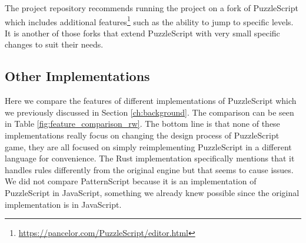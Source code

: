The project repository recommends running the project on a fork of PuzzleScript which includes additional features\footnote{\url{https://pancelor.com/PuzzleScript/editor.html}} such as the ability to jump to specific levels. It is another of those forks that extend PuzzleScript with very small specific changes to suit their needs\cite{pancelor}.

\subsection{Other Implementations}
Here we compare the features of different implementations of PuzzleScript which we previously discussed in Section \ref{ch:background}. The comparison can be seen in Table \ref{fig:feature_comparison_rw}. The bottom line is that none of these implementations really focus on changing the design process of PuzzleScript game, they are all focused on simply reimplementing PuzzleScript in a different language for convenience. The Rust implementation specifically mentions that it handles rules differently from the original engine but that seems to cause issues. We did not compare PatternScript\cite{PatternScript} because it is an implementation of PuzzleScript in JavaScript, something we already knew possible since the original implementation is in JavaScript.

